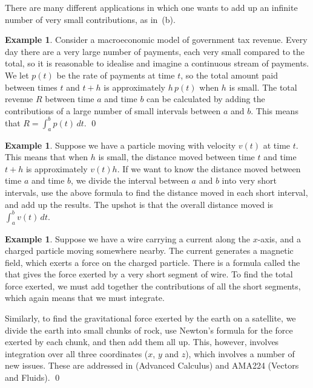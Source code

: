 \documentclass[a4paper]{book}
\theoremstyle{definition}
\newtheorem{example}[theorem]{Example}
\begin{document}
There are many different applications in which one wants to add up an
infinite number of very small contributions, as in~(b).
\begin{example}
 Consider a macroeconomic model of government tax revenue.  Every day
 there are a very large number of payments, each very small compared
 to the total, so it is reasonable to idealise and imagine a
 continuous stream of payments.  We let $p(t)$ be the rate of payments
 at time $t$, so the total amount paid between times $t$ and $t+h$ is
 approximately $h\,p(t)$ when $h$ is small.  The total revenue $R$
 between time $a$ and time $b$ can be calculated by adding the
 contributions of a large number of small intervals between $a$ and
 $b$.  This means that $R=\int_a^b p(t)\,dt$. \qed
\end{example}
\begin{example}
 Suppose we have a particle moving with velocity $v(t)$ at time $t$.
 This means that when $h$ is small, the distance moved between time
 $t$ and time $t+h$ is approximately $v(t)h$.  If we want to know the
 distance moved between time $a$ and time $b$, we divide the interval
 between $a$ and $b$ into very short intervals, use the above formula
 to find the distance moved in each short interval, and add up the
 results.  The upshot is that the overall distance moved is
 $\int_a^b v(t)\,dt$.
\end{example}
\begin{example}
 Suppose we have a wire carrying a current along the $x$-axis, and a
 charged particle moving somewhere nearby.  The current generates a
 magnetic field, which exerts a force on the charged particle.  There
 is a formula called the  that gives the force
 exerted by a very short segment of wire.  To find the total force
 exerted, we must add together the contributions of all the short
 segments, which again means that we must integrate.
 
 Similarly, to find the gravitational force exerted by the earth on a
 satellite, we divide the earth into small chunks of rock, use
 Newton's formula for the force exerted by each chunk, and then add
 them all up.  This, however, involves integration over all three
 coordinates ($x$, $y$ and $z$), which involves a number of new
 issues.  These are addressed in  (Advanced Calculus) and
 AMA224 (Vectors and Fluids).
 \qed
\end{example}
\end{document}
